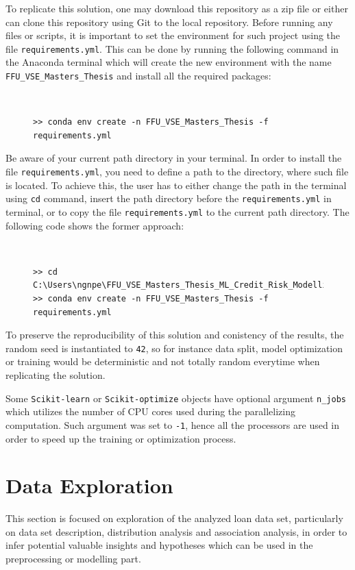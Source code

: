 To replicate this solution, one may download this repository as a zip file or either can clone this repository using Git to the local repository. Before running any files or scripts, it is important to set the environment for such project using the file \texttt{requirements.yml}. This can be done by running the following command in the Anaconda terminal which will create the new environment with the name \texttt{FFU\_VSE\_Masters\_Thesis} and install all the required packages:
\begin{figure}[H]
\centering\
{\footnotesize
\begin{verbatim}
>> conda env create -n FFU_VSE_Masters_Thesis -f requirements.yml    
\end{verbatim}
\vspace{-1em}
}
\end{figure}
Be aware of your current path directory in your terminal. In order to install the file \texttt{requirements.yml}, you need to define a path to the directory, where such file is located.
To achieve this, the user has to either change the path in the terminal using \texttt{cd} command, insert the path directory before the \texttt{requirements.yml} in terminal, or to copy the file \texttt{requirements.yml} to the current path directory. The following code shows the former approach:
\begin{figure}[H]
\centering\
{\footnotesize
\begin{verbatim}
>> cd C:\Users\ngnpe\FFU_VSE_Masters_Thesis_ML_Credit_Risk_Modelling
>> conda env create -n FFU_VSE_Masters_Thesis -f requirements.yml   
\end{verbatim}
\vspace{-1em}
}
\end{figure}


To preserve the reproducibility of this solution and conistency of the results, the random seed is instantiated to \texttt{42}, so for instance data split, model optimization or training would be deterministic and not totally random everytime when replicating the solution.

Some \lstinline{Scikit-learn} or \lstinline{Scikit-optimize} objects have optional argument \texttt{n\_jobs} which utilizes the number of CPU cores used during the parallelizing computation. Such argument was set to \texttt{-1}, hence all the processors are used in order to  speed up the training or optimization process.

\newpage
\section{Data Exploration}
This section is focused on exploration of the analyzed loan data set, particularly on data set description, distribution analysis and association analysis, in order to infer potential valuable insights and hypotheses which can be used in the preprocessing or modelling part.

